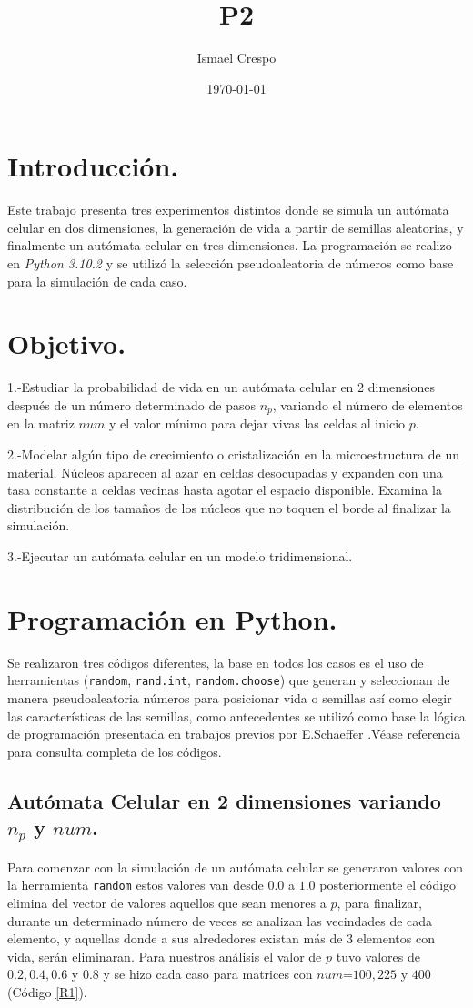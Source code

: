 \documentclass{article}
\title{P2}
\author{Ismael Crespo}
\date{\today}
\begin{document}
\maketitle

\section{Introducción.}
Este trabajo presenta tres experimentos distintos donde se simula un autómata celular en dos dimensiones, la generación de vida a partir de semillas aleatorias, y finalmente un autómata celular en tres dimensiones. La programación se realizo en \emph{Python 3.10.2} y se utilizó la selección pseudoaleatoria de números como base para la simulación de cada caso.
\section{Objetivo.}
1.-Estudiar la probabilidad de vida en un autómata celular en 2 dimensiones después de un número determinado de pasos $n_p$, variando el número de elementos en la matriz $num$ y el valor mínimo para dejar vivas las celdas al inicio $p$.

2.-Modelar algún tipo de crecimiento o cristalización en la microestructura de un material. Núcleos aparecen al azar en celdas desocupadas y expanden con una tasa constante a celdas vecinas hasta agotar el espacio disponible. Examina la distribución de los tamaños de los núcleos que no toquen el borde al finalizar la simulación.

3.-Ejecutar un autómata celular en un modelo tridimensional.
 
\section{Programación en Python.}
Se realizaron tres códigos diferentes, la base en todos los casos es el uso de herramientas (\texttt{random}, \texttt{rand.int}, \texttt{random.choose}) que generan y seleccionan de manera pseudoaleatoria números para posicionar vida o semillas así como elegir las características de las semillas, como antecedentes se utilizó como base la lógica de programación presentada en trabajos previos por E.Schaeffer \citep{E.Schaeffer}.Véase referencia \citep{REPOP2} para consulta completa de los códigos.
\subsection {Autómata Celular en 2 dimensiones variando $n_p$ y $num$.}
Para comenzar con la simulación de un autómata celular se generaron valores con la herramienta \texttt{random} estos valores van desde $0.0$ a $1.0$ posteriormente el código elimina del vector de valores aquellos que sean menores a $p$, para finalizar, durante un determinado número de veces se analizan las vecindades de cada elemento, y aquellas donde a sus alrededores existan más de 3 elementos con vida, serán eliminaran. Para nuestros análisis el valor de $p$  tuvo valores de $0.2, 0.4, 0.6$ y $0.8$ y se hizo cada caso para matrices con $num$=$100, 225$ y $400$ (Código \ref{R1}).
\end{document}
